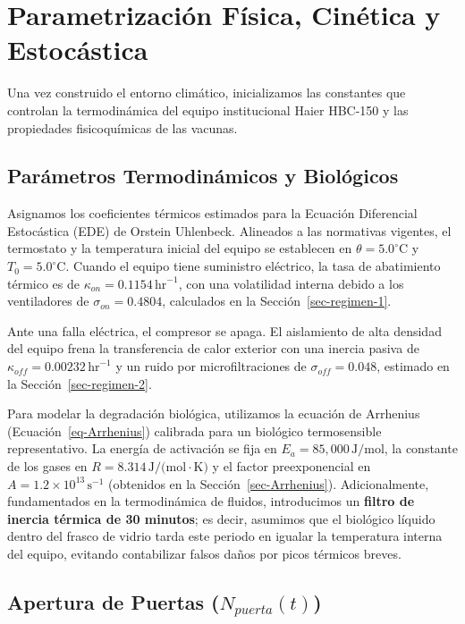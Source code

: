 \documentclass[
  spanish,
  us-letterpaper,
]{scrreprt}
\numberwithin{equation}{section}
\theoremstyle{plain}
\theoremstyle{plain}
\theoremstyle{definition}
\theoremstyle{plain}
\theoremstyle{remark}
\begin{document}
\section{Parametrización Física, Cinética y
Estocástica}\label{sec-parametrizacion-fisica}

Una vez construido el entorno climático, inicializamos las constantes
que controlan la termodinámica del equipo institucional Haier HBC-150 y
las propiedades fisicoquímicas de las vacunas.

\subsection{Parámetros Termodinámicos y
Biológicos}\label{sec-params-termo}

Asignamos los coeficientes térmicos estimados para la Ecuación
Diferencial Estocástica (EDE) de Orstein Uhlenbeck. Alineados a las
normativas vigentes, el termostato y la temperatura inicial del equipo
se establecen en \(\theta = 5.0^\circ\text{C}\) y
\(T_0 = 5.0^\circ\text{C}\). Cuando el equipo tiene suministro
eléctrico, la tasa de abatimiento térmico es de
\(\kappa_{on} = 0.1154\,\text{hr}^{-1}\), con una volatilidad interna
debido a los ventiladores de \(\sigma_{on} = 0.4804\), calculados en la
Sección~\ref{sec-regimen-1}.

Ante una falla eléctrica, el compresor se apaga. El aislamiento de alta
densidad del equipo frena la transferencia de calor exterior con una
inercia pasiva de \(\kappa_{off} = 0.00232\,\text{hr}^{-1}\) y un ruido
por microfiltraciones de \(\sigma_{off} = 0.048\), estimado en la
Sección~\ref{sec-regimen-2}.

Para modelar la degradación biológica, utilizamos la ecuación de
Arrhenius (Ecuación~\ref{eq-Arrhenius}) calibrada para un biológico
termosensible representativo. La energía de activación se fija en
\(E_a = 85,000\,\text{J/mol}\), la constante de los gases en
\(R = 8.314\,\text{J/(mol}\cdot\text{K)}\) y el factor preexponencial en
\(A = 1.2 \times 10^{13} \, \text{s}^{-1}\) (obtenidos en la
Sección~\ref{sec-Arrhenius}). Adicionalmente, fundamentados en la
termodinámica de fluidos, introducimos un \textbf{filtro de inercia
térmica de 30 minutos}; es decir, asumimos que el biológico líquido
dentro del frasco de vidrio tarda este periodo en igualar la temperatura
interna del equipo, evitando contabilizar falsos daños por picos
térmicos breves.

\subsection{\texorpdfstring{Apertura de Puertas
(\(N_{puerta}(t)\))}{Apertura de Puertas (N\_\{puerta\}(t))}}\label{sec-aperturas-puerta}
\end{document}

